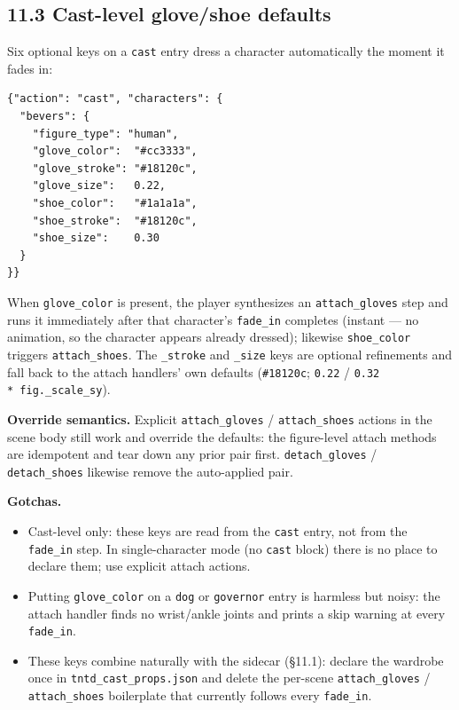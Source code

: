 \documentclass[
  12pt,
  letterpaper,
]{book}
\begin{document}
\subsection{\texorpdfstring{11.3 Cast-level glove/shoe
defaults}{11.3 Cast-level glove/shoe defaults}}\label{cast-level-glove-shoe-defaults}

Six optional keys on a \texttt{cast} entry dress a character
automatically the moment it fades in:

\begin{verbatim}
{"action": "cast", "characters": {
  "bevers": {
    "figure_type": "human",
    "glove_color":  "#cc3333",
    "glove_stroke": "#18120c",
    "glove_size":   0.22,
    "shoe_color":   "#1a1a1a",
    "shoe_stroke":  "#18120c",
    "shoe_size":    0.30
  }
}}
\end{verbatim}

When \texttt{glove\_color} is present, the player synthesizes an
\texttt{attach\_gloves} step and runs it immediately after that
character's \texttt{fade\_in} completes (instant --- no animation, so
the character appears already dressed); likewise
\texttt{shoe\_color} triggers \texttt{attach\_shoes}. The
\texttt{\_stroke} and \texttt{\_size} keys are optional refinements
and fall back to the attach handlers' own defaults
(\texttt{\#18120c}; \texttt{0.22} / \texttt{0.32}
\texttt{*\ fig.\_scale\_sy}).

\textbf{Override semantics.} Explicit \texttt{attach\_gloves} /
\texttt{attach\_shoes} actions in the scene body still work and
override the defaults: the figure-level attach methods are idempotent
and tear down any prior pair first. \texttt{detach\_gloves} /
\texttt{detach\_shoes} likewise remove the auto-applied pair.

\textbf{Gotchas.}

\begin{itemize}
\item
  Cast-level only: these keys are read from the \texttt{cast} entry,
  not from the \texttt{fade\_in} step. In single-character mode (no
  \texttt{cast} block) there is no place to declare them; use explicit
  attach actions.
\item
  Putting \texttt{glove\_color} on a \texttt{dog} or
  \texttt{governor} entry is harmless but noisy: the attach handler
  finds no wrist/ankle joints and prints a skip warning at every
  \texttt{fade\_in}.
\item
  These keys combine naturally with the sidecar (§11.1): declare the
  wardrobe once in \texttt{tntd\_cast\_props.json} and delete the
  per-scene \texttt{attach\_gloves} / \texttt{attach\_shoes}
  boilerplate that currently follows every \texttt{fade\_in}.
\end{itemize}
\end{document}
